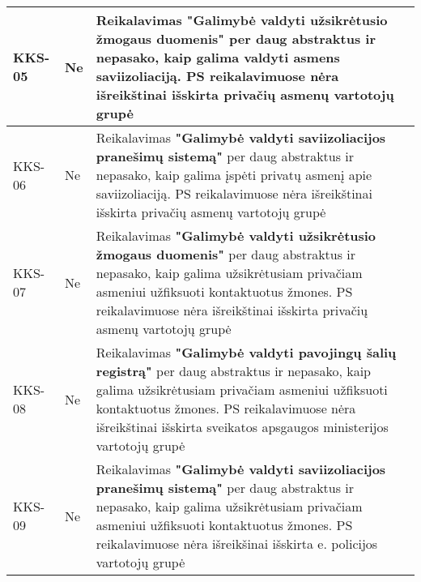 \documentclass{VUMIFPSkursinis}
\begin{document}
\begin{center}
\begin{longtable}{|C{2cm}|L{2.5cm}|L{10cm}|}
		KKS-05                                          &
		Ne                                              &
		Reikalavimas \textbf{"Galimybė valdyti užsikrėtusio žmogaus duomenis"} per daug abstraktus ir nepasako, kaip galima valdyti asmens saviizoliaciją. PS reikalavimuose nėra išreikštinai išskirta privačių asmenų vartotojų grupė                                               \\ \hline
		KKS-06                                          &
		Ne                                              &
		Reikalavimas \textbf{"Galimybė valdyti saviizoliacijos pranešimų sistemą"} per daug abstraktus ir nepasako, kaip galima įspėti privatų asmenį apie saviizoliaciją. PS reikalavimuose nėra išreikštinai išskirta privačių asmenų vartotojų grupė                               \\ \hline
		KKS-07                                          &
		Ne                                              &
		Reikalavimas \textbf{"Galimybė valdyti užsikrėtusio žmogaus duomenis"} per daug abstraktus ir nepasako, kaip galima užsikrėtusiam privačiam asmeniui užfiksuoti kontaktuotus žmones. PS reikalavimuose nėra išreikštinai išskirta privačių asmenų vartotojų grupė             \\ \hline
		KKS-08                                          &
		Ne                                              &
		Reikalavimas \textbf{"Galimybė valdyti pavojingų šalių registrą"} per daug abstraktus ir nepasako, kaip galima užsikrėtusiam privačiam asmeniui užfiksuoti kontaktuotus žmones. PS reikalavimuose nėra išreikštinai išskirta sveikatos apsgaugos ministerijos vartotojų grupė \\ \hline
		KKS-09                                          &
		Ne                                              &
		Reikalavimas \textbf{"Galimybė valdyti saviizoliacijos pranešimų sistemą"} per daug abstraktus ir nepasako, kaip galima užsikrėtusiam privačiam asmeniui užfiksuoti kontaktuotus žmones. PS reikalavimuose nėra išreikšinai išskirta e. policijos vartotojų grupė             \\ \hline
	\end{longtable}
\end{center}

\end{document}
